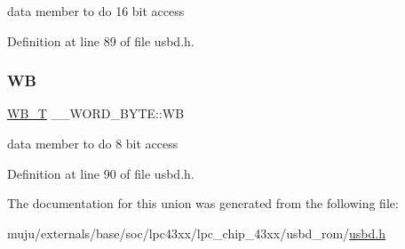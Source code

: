 data member to do 16 bit access 

Definition at line 89 of file usbd.\+h.

\mbox{\label{union_____w_o_r_d___b_y_t_e_a3ea700711d4333320b15562bbf2ab59c}} 
\subsubsection{\texorpdfstring{WB}{WB}}
{\footnotesize\ttfamily \hyperlink{group___u_s_b_d___core_ga4fbe30f5ac133f5bb15c653a19162ae9}{W\+B\+\_\+T} \+\_\+\+\_\+\+W\+O\+R\+D\+\_\+\+B\+Y\+T\+E\+::\+WB}

data member to do 8 bit access 

Definition at line 90 of file usbd.\+h.



The documentation for this union was generated from the following file\+:\begin{DoxyCompactItemize}
\item 
muju/externals/base/soc/lpc43xx/lpc\+\_\+chip\+\_\+43xx/usbd\+\_\+rom/\hyperlink{usbd_8h}{usbd.\+h}\end{DoxyCompactItemize}
